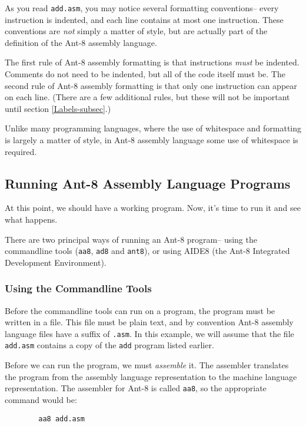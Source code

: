 As you read {\tt add.asm}, you may notice several formatting
conventions-- every instruction is indented,
and each line contains at most one instruction.  These conventions are
{\em not} simply a matter of style, but are actually part of the
definition of the {\sc Ant-8} assembly language.

The first rule of {\sc Ant-8} assembly formatting is that instructions {\em
must} be indented.  Comments do not need to be indented, but all of
the code itself must be.  The second rule of {\sc Ant-8} assembly formatting
is that only one instruction can appear on each line.  (There are a
few additional rules, but these will not be important until section
\ref{Labels-subsec}.)

Unlike many programming languages, where the use of whitespace and
formatting is largely a matter of style, in {\sc Ant-8} assembly language some
use of whitespace is required.

\subsection{Running {\sc Ant-8} Assembly Language Programs}

At this point, we should have a working program.  Now, it's time to
run it and see what happens.

There are two principal ways of running an {\sc Ant-8} program-- using
the commandline tools ({\tt aa8}, {\tt ad8} and {\tt ant8}), or using
{\sc AIDE8} (the {\sc Ant-8} Integrated Development Environment).

\subsubsection{Using the Commandline Tools}

Before the commandline tools can run on a program, the program
must be written in a file.  This file must be plain text, and by
convention {\sc Ant-8} assembly language files have a suffix of {\tt .asm}.
In this example, we will assume that the file {\tt add.asm} contains
a copy of the {\tt add} program listed earlier.

Before we can run the program, we must {\em assemble} it.  The
assembler translates the program from the assembly language
representation to the machine language representation.  The assembler
for {\sc Ant-8} is called {\tt aa8}, so the appropriate command would be:

\begin{verbatim}
        aa8 add.asm
\end{verbatim}

